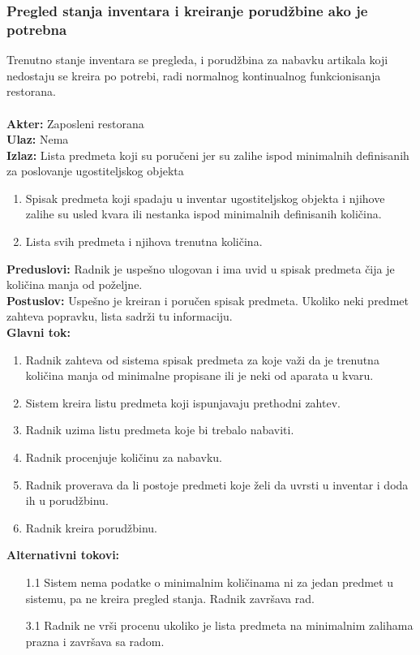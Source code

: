 \documentclass{article}
\begin{document}
\subsubsection{Pregled stanja inventara i kreiranje porudžbine ako je potrebna}
Trenutno stanje inventara se pregleda, i porudžbina za nabavku artikala koji nedostaju se kreira po potrebi, radi normalnog kontinualnog funkcionisanja restorana.\\\\
\textbf{Akter:} Zaposleni restorana\\
\textbf{Ulaz:} Nema\\
\textbf{Izlaz:} Lista predmeta koji su poručeni jer su zalihe ispod minimalnih definisanih za poslovanje ugostiteljskog objekta\\
\begin{enumerate}
	\item Spisak predmeta koji spadaju u inventar ugostiteljskog objekta i njihove zalihe su usled kvara ili nestanka ispod minimalnih definisanih količina.
	\item Lista svih predmeta i njihova trenutna količina.
\end{enumerate} 
\textbf{Preduslovi:} Radnik je uspešno ulogovan i ima uvid u spisak predmeta čija je količina manja od poželjne.\\
\textbf{Postuslov:} Uspešno je kreiran i poručen spisak predmeta. Ukoliko neki predmet zahteva popravku, lista sadrži tu informaciju.\\
\textbf{Glavni tok:} 
\begin{enumerate}
	\item Radnik zahteva od sistema spisak predmeta za koje važi da je trenutna količina manja od minimalne propisane ili je neki od aparata u kvaru.
	\item Sistem kreira listu predmeta koji ispunjavaju prethodni zahtev.
    \item Radnik uzima listu predmeta koje bi trebalo nabaviti.
	\item Radnik procenjuje količinu za nabavku. 
	\item Radnik proverava da li postoje predmeti koje želi da uvrsti u inventar i doda ih u porudžbinu.
	\item Radnik kreira porudžbinu.
\end{enumerate}
\textbf{Alternativni tokovi:}
\begin{itemize}
\item [1.1] Sistem nema podatke o minimalnim količinama ni za jedan predmet u sistemu, pa ne kreira pregled stanja. Radnik završava rad.
\item [3.1] Radnik ne vrši procenu ukoliko je lista predmeta na minimalnim zalihama prazna i završava sa radom.
\end{itemize}
\end{document}
